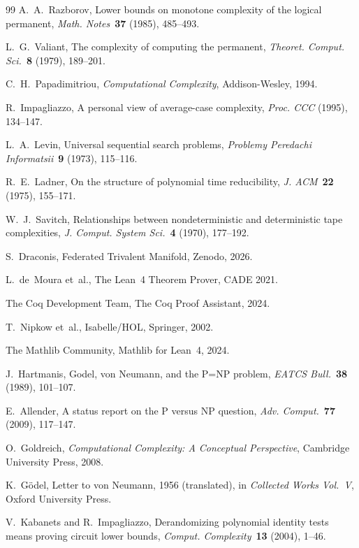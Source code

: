 \documentclass[12pt]{article}
\theoremstyle{plain}
\theoremstyle{definition}
\begin{document}
\begin{thebibliography}{99}
A.~A.~Razborov,
Lower bounds on monotone complexity of the logical permanent,
\emph{Math. Notes}\ \textbf{37} (1985), 485--493.

L.~G.~Valiant,
The complexity of computing the permanent,
\emph{Theoret. Comput. Sci.}\ \textbf{8} (1979), 189--201.

C.~H.~Papadimitriou,
\emph{Computational Complexity},
Addison-Wesley, 1994.

R.~Impagliazzo,
A personal view of average-case complexity,
\emph{Proc. CCC} (1995), 134--147.

L.~A.~Levin,
Universal sequential search problems,
\emph{Problemy Peredachi Informatsii}\ \textbf{9} (1973), 115--116.

R.~E.~Ladner,
On the structure of polynomial time reducibility,
\emph{J. ACM}\ \textbf{22} (1975), 155--171.

W.~J.~Savitch,
Relationships between nondeterministic and deterministic tape complexities,
\emph{J. Comput. System Sci.}\ \textbf{4} (1970), 177--192.

S.~Draconis,
Federated Trivalent Manifold, Zenodo, 2026.

L.~de~Moura et~al., The Lean~4 Theorem Prover, CADE 2021.

The Coq Development Team, The Coq Proof Assistant, 2024.

T.~Nipkow et~al., Isabelle/HOL, Springer, 2002.

The Mathlib Community, Mathlib for Lean~4, 2024.

J.~Hartmanis,
Godel, von Neumann, and the P=NP problem,
\emph{EATCS Bull.}\ \textbf{38} (1989), 101--107.

E.~Allender,
A status report on the P versus NP question,
\emph{Adv. Comput.}\ \textbf{77} (2009), 117--147.

O.~Goldreich,
\emph{Computational Complexity: A Conceptual Perspective},
Cambridge University Press, 2008.

K.~G\"odel,
Letter to von Neumann, 1956 (translated), in
\emph{Collected Works Vol.~V}, Oxford University Press.

V.~Kabanets and R.~Impagliazzo,
Derandomizing polynomial identity tests means proving circuit lower bounds,
\emph{Comput. Complexity}\ \textbf{13} (2004), 1--46.

\end{thebibliography}
\end{document}

